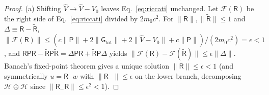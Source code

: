 \documentclass[aps,prd,onecolumn,tightenlines,nofootinbib,notitlepage,10pt,floatfix]{revtex4-2}
\theoremstyle{indentedtheorem}
\begin{document}
\begin{proof}
(a) Shifting $\hat{V}\to\hat{V}-V_0$ leaves Eq.~\eqref{eq:riccati} unchanged. Let $\mathcal{F}(\mathsf{R})$ be the right side of Eq.~\eqref{eq:riccati} divided by $2m_0 c^2$. For $\|\mathsf{R}\|,\|\tilde{\mathsf{R}}\|\le 1$ and $\Delta\equiv\mathsf{R}-\tilde{\mathsf{R}}$, $\|\mathcal{F}(\mathsf{R})\|\le(c\|\mathsf{P}\|+2\|\mathsf{G}_\text{tot}\|+2\|\hat{V}-V_0\|+c\|\mathsf{P}\|)/(2m_0 c^2)=\epsilon<1$, and $\mathsf{R}\mathsf{P}\mathsf{R}-\tilde{\mathsf{R}}\mathsf{P}\tilde{\mathsf{R}}=\Delta\mathsf{P}\mathsf{R}+\tilde{\mathsf{R}}\mathsf{P}\Delta$ yields $\|\mathcal{F}(\mathsf{R})-\mathcal{F}(\tilde{\mathsf{R}})\|\le\epsilon\|\Delta\|$. Banach's fixed-point theorem gives a unique solution $\|\mathsf{R}\|\le\epsilon<1$ (and symmetrically $u=\mathsf{R}_-w$ with $\|\mathsf{R}_-\|\le\epsilon$ on the lower branch, decomposing $\mathcal{H}\oplus\mathcal{H}$ since $\|\mathsf{R}_-\mathsf{R}\|\le\epsilon^2<1$).


\end{proof}
\end{document}

